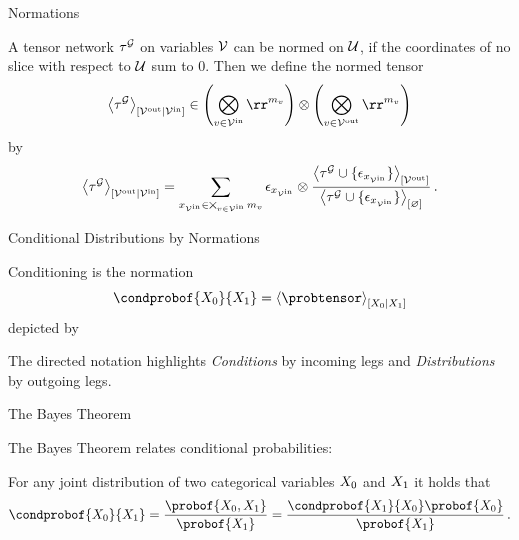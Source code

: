 \documentclass{beamer}
\begin{document}
\begin{frame}{Normations}

\begin{definition}
	A tensor network $\tau^{\mathcal{G}}$ on variables $\mathcal{V}$ can be normed on $\mathcal{U}$, if the coordinates of no slice with respect to $\mathcal{U}$ sum to $0$.
	Then we define the normed tensor
		\[ \normalizationofwrt{\extnet}{\outnodes}{\innodes}
		\in \left( \bigotimes_{\node\in\innodes} \rr^{\catdimof{\node}} \right) \otimes \left( \bigotimes_{\node\in\outnodes} \rr^{\catdimof{\node}} \right) \]
	by
	 \begin{align*}
	 	\left\langle \tau^{\mathcal{G}}\right\rangle_{\left[ \mathcal{V}^{\mathrm{out}} | \mathcal{V}^{\mathrm{in}} \right]}
		= \sum_{x_{\mathcal{V}^{\mathrm{in}}}\in\bigtimes_{v\in\mathcal{V}^{\mathrm{in}}}m_{v}} 
		\epsilon_{x_{\mathcal{V}^{\mathrm{in}}}} \otimes \frac{
		\left\langle \tau^{\mathcal{G}}\cup\{\epsilon_{x_{\mathcal{V}^{\mathrm{in}}}}\}\right\rangle_{\left[ \mathcal{V}^{\mathrm{out}} \right]}
		}{
		\left\langle \tau^{\mathcal{G}}\cup\{\epsilon_{x_{\mathcal{V}^{\mathrm{in}}}}\}\right\rangle_{\left[ \varnothing \right]}
		} \, . 
	 \end{align*}
\end{definition}

\end{frame}



\begin{frame}{Conditional Distributions by Normations}

Conditioning is the normation
	\[ \condprobof{\exrandom}{\secexrandom} = \normalizationofwrt{\probtensor}{\exrandom}{\secexrandom} \]
depicted by
\begin{center}
	
\end{center}

The directed notation highlights \emph{Conditions} by incoming legs and \emph{Distributions} by outgoing legs.


\end{frame}


\begin{frame}{The Bayes Theorem}

The Bayes Theorem relates conditional probabilities:

\begin{theorem}
	For any joint distribution of two categorical variables $X_{0}$ and $X_{1}$ it holds that
	\[ \condprobof{\exrandom}{\secexrandom} = \frac{\probof{\exrandom,\secexrandom}}{\probof{\secexrandom}} 
	= \frac{\condprobof{\secexrandom}{\exrandom}\probof{\exrandom}}{\probof{\secexrandom}}  \, . \]
\end{theorem}	

\end{frame}
\end{document}

